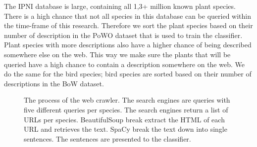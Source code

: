 \documentclass[a4paper, 12pt, oneside]{book} %
\begin{document}
The IPNI database is large, containing all 1,3+ million known plant species.
There is a high chance that not all species in this database can be queried within the time-frame of this research.
Therefore we sort the plant species based on their number of description in the PoWO dataset that is used to train the classifier.
Plant species with more descriptions also have a higher chance of being described somewhere else on the web.
This way we make sure the plants that will be queried have a high chance to contain a description somewhere on the web.
We do the same for the bird species; bird species are sorted based on their number of descriptions in the BoW dataset.

\begin{figure} [t]
    \centering
    \caption[Web Crawler]{The process of the web crawler. The search engines are queries with five different queries per species. The search engines return a list of URLs per species. BeautifulSoup break extract the HTML of each URL and retrieves the text. SpaCy break the text down into single sentences. The sentences are presented to the classifier.}
    \label{fig:webcrawler}
\end{figure}
\end{document}
